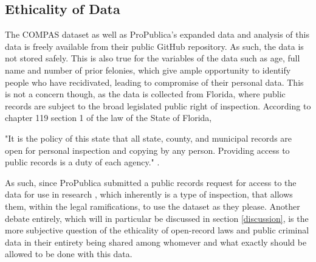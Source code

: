 \documentclass[11pt, fleqn, titlepage]{article}
\begin{document}
	\subsection{Ethicality of Data}\label{ethicality_of_data}
	The COMPAS dataset as well as ProPublica's expanded data and analysis of this data is freely available from their public GitHub repository. As such, the data is not stored safely. This is also true for the variables of the data such as age, full name and number of prior felonies, which give ample opportunity to identify people who have recidivated, leading to compromise of their personal data. This is not a concern though, as the data is collected from Florida, where public records are subject to the broad legislated public right of inspection. According to chapter 119 section 1 of the law of the State of Florida, 
	\begin{displayquote}
		"It is the policy of this state that all state, county, and municipal records are open for personal inspection and copying by any person. Providing access to public records is a duty of each agency." \cite{floridaLaw}.
	\end{displayquote}
	
	\noindent As such, since ProPublica submitted a public records request for access to the data for use in research \cite{propublicaAnalysis}, which inherently is a type of inspection, that allows them, within the legal ramifications, to use the dataset as they please. Another debate entirely, which will in particular be discussed in section \ref{discussion}, is the more subjective question of the ethicality of open-record laws and public criminal data in their entirety being shared among whomever and what exactly should be allowed to be done with this data.
	
		
\end{document}
